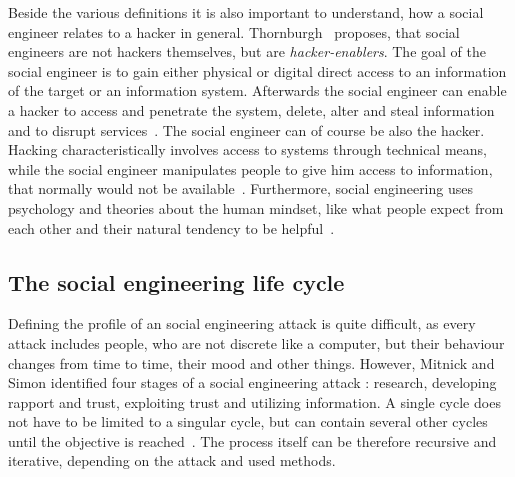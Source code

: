 Beside the various definitions it is also important to understand, how a social
engineer relates to a hacker in general. Thornburgh~\cite{thornburgh2004}
proposes, that social engineers are not hackers themselves, but are
\textit{hacker-enablers}.  The goal of the social engineer is to gain either
physical or digital direct access to an information of the target or an
information system. Afterwards the social engineer can enable a hacker to
access and penetrate the system, delete, alter and steal information and to
disrupt services~\cite{thornburgh2004}. The social engineer can of course be
also the hacker.  Hacking characteristically involves access to systems through
technical means, while the social engineer manipulates people to give him
access to information, that normally would not be available~\cite{jones2004}.
Furthermore, social engineering uses psychology and theories about the human
mindset, like what people expect from each other and their natural tendency to
be helpful~\cite{jones2004}.


\subsection{The social engineering life cycle}

Defining the profile of an social engineering attack is quite difficult, as
every attack includes people, who are not discrete like a computer, but their
behaviour changes from time to time, their mood and other things. However,
Mitnick and Simon identified four stages of a social engineering attack
\cite{mitnick2003}: research, developing rapport and trust, exploiting trust
and utilizing information. A single cycle does not have to be limited to a
singular cycle, but can contain several other cycles until the objective is
reached~\cite{thornburgh2004}. The process itself can be therefore recursive
and iterative, depending on the attack and used methods.

